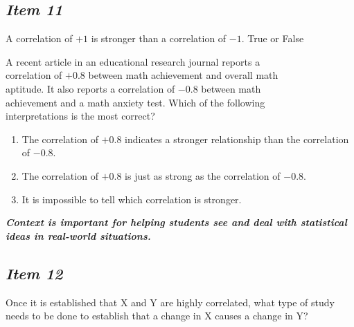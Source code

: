 \subsection{\textbf{\textit{Item 11}}}
A correlation of $+1$ is stronger than a correlation of $-1$. True or False\\
\vspace{8pt}

\noindent{}

A recent article in an educational research journal reports a \\ correlation of  $+0.8$ between math achievement and overall math \\ aptitude. It also reports a correlation of  $-0.8$ between math\\ achievement and a math anxiety test. Which of the following\\ interpretations is the most correct?
\begin{enumerate} [leftmargin=2cm, itemsep=.2em]
\item The correlation of $+0.8$ indicates a stronger relationship than the correlation of $-0.8$.
\item The correlation of $+0.8$ is just as strong as the correlation of $-0.8$.
\item It is impossible to tell which correlation is stronger.
\end{enumerate}

\noindent \textbf{\textit{Context is important for helping students see and deal with statistical ideas in real-world situations.}}

\subsection{\textbf{\textit{Item 12}}}
Once it is established that X and Y are highly correlated, what type of study needs to be done to establish that a change in X causes a change in Y?\\

\vspace{8pt}
\noindent{}

